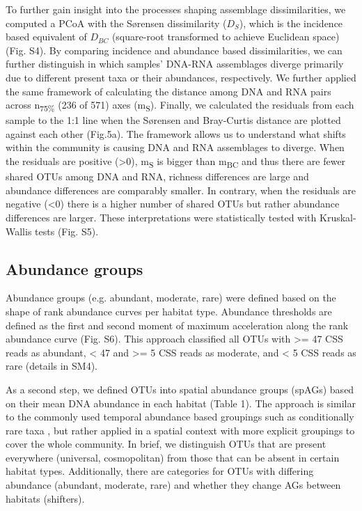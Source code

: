 \documentclass[12pt,a4paper]{article} %
\begin{document}
To further gain insight into the processes shaping assemblage dissimilarities, we computed a PCoA with the S{\o}rensen dissimilarity ($D_{S}$), which is the incidence based equivalent of $D_{BC}$ (square-root transformed to achieve Euclidean space) \citep{Legendre1998, Sorensen1948}(Fig. S4). By comparing incidence and abundance based dissimilarities, we can further distinguish in which samples' DNA-RNA assemblages diverge primarily due to different present taxa or their abundances, respectively. We further applied the same framework of calculating the distance among DNA and RNA pairs across n\textsubscript{75\%} (236 of 571) axes (m\textsubscript{S}). Finally, we calculated the residuals from each sample to the 1:1 line when the S{\o}rensen and Bray-Curtis distance are plotted against each other (Fig.5a). The framework allows us to understand what shifts within the community is causing DNA and RNA assemblages to diverge. When the residuals are positive (>0), m\textsubscript{S} is bigger than m\textsubscript{BC} and thus there are fewer shared OTUs among DNA and RNA, richness differences are large and abundance differences are comparably smaller. In contrary, when the residuals are negative (<0) there is a higher number of shared OTUs but rather abundance differences are larger. These interpretations were statistically tested with Kruskal-Wallis tests (Fig. S5).

\subsection*{Abundance groups}
Abundance groups (e.g. abundant, moderate, rare) were defined based on the shape of rank abundance curves per habitat type. Abundance thresholds are defined as the first and second moment of maximum acceleration along the rank abundance curve (Fig. S6). This approach classified all OTUs with >= 47 CSS reads as abundant, < 47 and >= 5 CSS reads as moderate, and < 5 CSS reads as rare (details in SM4).

As a second step, we defined OTUs into spatial abundance groups (spAGs) based on their mean DNA abundance in each habitat (Table 1). The approach is similar to the commonly used temporal abundance based groupings such as conditionally rare taxa \citep{Shade2014}, but rather applied in a spatial context with more explicit groupings to cover the whole community. In brief, we distinguish OTUs that are present everywhere (universal, cosmopolitan) from those that can be absent in certain habitat types. Additionally, there are categories for OTUs with differing abundance (abundant, moderate, rare) and whether they change AGs between habitats (shifters).
\end{document}

